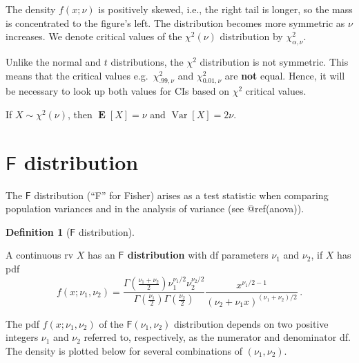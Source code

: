 \documentclass[
  a4paper,
  oneside]{book}
\DeclareMathOperator{\E}{\mathbf{E}}%
\DeclareMathOperator{\Var}{Var}%
\theoremstyle{definition}
\newtheorem{definition}{Definition}[chapter]
\theoremstyle{definition}
\theoremstyle{definition}
\theoremstyle{plain}
\theoremstyle{remark}
\begin{document}
The density \(f(x;\nu)\) is positively skewed, i.e., the right tail is
longer, so the mass is concentrated to the figure's left. The
distribution becomes more symmetric as \(\nu\) increases. We denote
critical values of the \(\chi^2(\nu)\) distribution by
\(\chi^2_{\alpha, \nu}\).

\begin{warningblock}
Unlike the normal and \(t\) distributions, the \(\chi^2\) distribution
is not symmetric. This means that the critical values
e.g.~\(\chi^2_{.99, \nu}\) and \(\chi^2_{0.01,\nu}\) are \textbf{not}
equal. Hence, it will be necessary to look up both values for CIs based
on \(\chi^2\) critical values.

\end{warningblock}

If \(X \sim \chi^2(\nu)\), then \(\E[X] = \nu\) and \(\Var[X] = 2\nu\).

\section{\texorpdfstring{\(\mathsf{F}\)
distribution}{\textbackslash mathsf\{F\} distribution}}\label{F-distribution}

The \(\mathsf{F}\) distribution (``F'' for Fisher) arises as a test
statistic when comparing population variances and in the analysis of
variance (see @ref(anova)).

\begin{definition}[\(\mathsf{F}\)
distribution]\protect\hypertarget{def-F-dist}{}\label{def-F-dist}

A continuous rv \(X\) has an \textbf{\(\mathsf{F}\) distribution} with
df parameters \(\nu_1\) and \(\nu_2\), if \(X\) has pdf \[
 f(x; \nu_1, \nu_2) = 
    \frac{\Gamma\left(\frac{\nu_1+\nu_2}{2}\right) \nu_1^{\nu_1/2} \nu_2^{\nu_2/2}}
 {\Gamma\left(\frac{\nu_1}{2}\right) \Gamma\left(\frac{\nu_2}{2}\right)} 
 \frac{x^{\nu_1/2 - 1}}{(\nu_2+\nu_1 x)^{(\nu_1+\nu_2)/2}} \,.
\]

\end{definition}

The pdf \(f(x; \nu_1, \nu_2)\) of the \(\mathsf{F}(\nu_1, \nu_2)\)
distribution depends on two positive integers \(\nu_1\) and \(\nu_2\)
referred to, respectively, as the numerator and denominator df. The
density is plotted below for several combinations of \((\nu_1, \nu_2)\).
\end{document}
